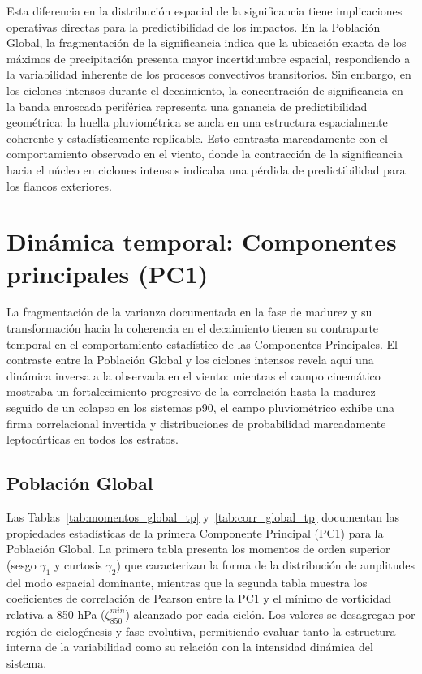 Esta diferencia en la distribución espacial de la significancia tiene implicaciones operativas directas para la predictibilidad de los impactos. 
En la Población Global, la fragmentación de la significancia indica que la ubicación exacta de los máximos de precipitación presenta mayor incertidumbre espacial, respondiendo a la variabilidad inherente de los procesos convectivos transitorios. 
Sin embargo, en los ciclones intensos durante el decaimiento, la concentración de significancia en la banda enroscada periférica representa una ganancia de predictibilidad geométrica: la huella pluviométrica se ancla en una estructura espacialmente coherente y estadísticamente replicable. 
Esto contrasta marcadamente con el comportamiento observado en el viento, donde la contracción de la significancia hacia el núcleo en ciclones intensos indicaba una pérdida de predictibilidad para los flancos exteriores. 

\section{Dinámica temporal: Componentes principales (PC1)}\label{sec:dinamica_pc1_tp}

La fragmentación de la varianza documentada en la fase de madurez y su transformación hacia la coherencia en el decaimiento tienen su contraparte temporal en el comportamiento estadístico de las Componentes Principales.
El contraste entre la Población Global y los ciclones intensos revela aquí una dinámica inversa a la observada en el viento: mientras el campo cinemático mostraba un fortalecimiento progresivo de la correlación hasta la madurez seguido de un colapso en los sistemas p90, el campo pluviométrico exhibe una firma correlacional invertida y distribuciones de probabilidad marcadamente leptocúrticas en todos los estratos.

\subsection{Población Global}\label{subsubsec:pc1_global_tp}





Las Tablas~\ref{tab:momentos_global_tp} y~\ref{tab:corr_global_tp} documentan las propiedades estadísticas de la primera Componente Principal (PC1) para la Población Global. 
La primera tabla presenta los momentos de orden superior (sesgo $\gamma_1$ y curtosis $\gamma_2$) que caracterizan la forma de la distribución de amplitudes del modo espacial dominante, mientras que la segunda tabla muestra los coeficientes de correlación de Pearson entre la PC1 y el mínimo de vorticidad relativa a 850 hPa ($\zeta_{850}^{min}$) alcanzado por cada ciclón. 
Los valores se desagregan por región de ciclogénesis y fase evolutiva, permitiendo evaluar tanto la estructura interna de la variabilidad como su relación con la intensidad dinámica del sistema.

